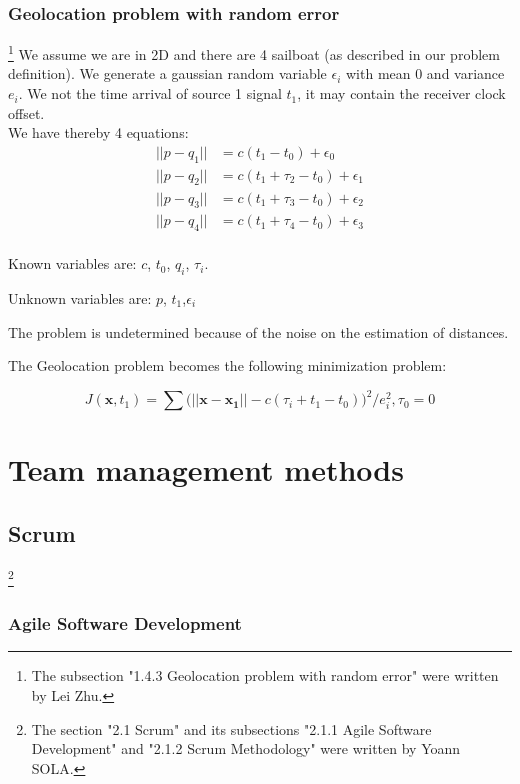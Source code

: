 \documentclass[a4paper]{report}
\begin{document}
\subsection{Geolocation problem with random error}
\footnote{The subsection "1.4.3 Geolocation problem with random error" were written by Lei Zhu.}
We assume we are in 2D and there are 4 sailboat (as described in our problem definition). We generate a gaussian random variable $\epsilon_i$ with mean  0 and variance $e_i$. We not the time arrival of source 1 signal $t_1$, it may contain the receiver clock offset.\\
We have thereby 4 equations: 
\begin{align}
||p - q_1|| &= c(t_1 - t_0) + \epsilon_0\nonumber \\
||p - q_2|| &= c(t_1 + \tau_2 - t_0) + \epsilon_1\\
||p - q_3|| &= c(t_1 + \tau_3 - t_0) + \epsilon_2\nonumber \\
||p - q_4|| &= c(t_1 + \tau_4 - t_0) + \epsilon_3\nonumber\\
\label{eq:distance_tdoa_}
\end{align}

Known variables are: $c$, $t_0$, $q_i$, $\tau_i$.

Unknown variables are: $p$, $t_1$,$\epsilon_i$

The problem is undetermined because of the noise on the estimation of distances.

The Geolocation problem becomes the following minimization problem:

\begin{equation}
J(\mathbf{x}, t_1) = \sum \Big ( ||\mathbf{x-x_1}|| - c(\tau_i+t_1-t_0) \Big )^2 / e_i^2 ,\tau_0=0
\end{equation}


\chapter{Team management methods}
\section{Scrum}

\footnote{The section "2.1 Scrum" and its subsections "2.1.1 Agile Software Development" and "2.1.2 Scrum Methodology" were written by Yoann SOLA.}

\subsection{Agile Software Development}
\end{document}

